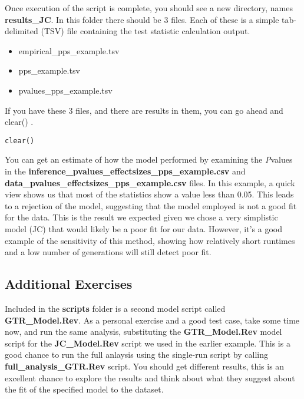 \begin{equation *}
\begin{equation *}
\begin{equation *}
Once execution of the script is complete, you should see a new directory, names \textbf{results\_JC}. In this folder there should be 3 files. Each of these is a simple tab-delimited (TSV) file containing the test statistic calculation output.

\begin{itemize}
\item empirical\_pps\_example.tsv
\item pps\_example.tsv
\item pvalues\_pps\_example.tsv
\end{itemize}

If you have these 3 files, and there are results in them, you can go ahead and clear() \RevBayes.

{\tt \begin{Snugshade}[184,207,236]
\begin{lstlisting}  
clear()
\end{lstlisting}
\end{Snugshade}}

You can get an estimate of how the model performed by examining the \textit{P}\-values in the 
\textbf{inference\_pvalues\_effectsizes\_pps\_example.csv} and \textbf{data\_pvalues\_effectsizes\_pps\_example.csv} files. In this example, a quick view shows us that most of the statistics show a value less than 0.05. This leads to a rejection of the model, suggesting 
that the model employed is not a good fit for the data. This is the result we expected given we chose a very 
simplistic model (JC) that would likely be a poor fit for our data. However, it's a good example 
of the sensitivity of this method, showing how relatively short runtimes and a low number of generations will 
still detect poor fit. 


\subsection{Additional Exercises}

Included in the \textbf{scripts} folder is a second model script called \textbf{GTR\_Model.Rev}. 
As a personal exercise and a good test case, take some time now, and run the same analysis, substituting
the \textbf{GTR\_Model.Rev} model script for the \textbf{JC\_Model.Rev} script we used in the earlier example.
This is a good chance to run the full anlaysis using the single-run script by calling \textbf{full\_analysis\_GTR.Rev} script.  
You should get different results, this is an excellent chance to explore the results and think about what
they suggest about the fit of the specified model to the dataset. 


\end{equation *}
\end{equation *}
\end{equation *}

